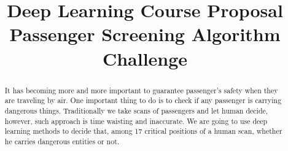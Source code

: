\documentclass[conference,compsoc]{IEEEtran}
\begin{document}
\title{
	Deep Learning Course Proposal \\
	Passenger Screening Algorithm Challenge \\
}


\author{
\and
}

\maketitle

\begin{abstract}
	It has becoming more and more important to guarantee passenger's safety when they are traveling by air. One important thing to do is to check if any passenger is carrying dangerous things. Traditionally we take scans of passengers and let human decide, however, such approach is time waisting and inaccurate. We are going to use deep learning methods to decide that, among 17 critical positions of a human scan, whether he carries dangerous entities or not.
\end{abstract}
\end{document}
